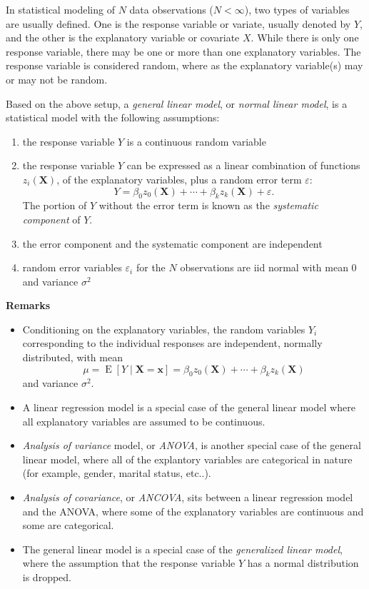 \documentclass[12pt]{article}
\begin{document}

In statistical modeling of $N$ data observations ($N<\infty$), two types of variables are usually defined.  One is the response variable or variate, usually denoted by $Y$, and the other is the explanatory variable or covariate $X$.  While there is only one response variable, there may be one or more than one explanatory variables.  The response variable is considered random, where as the explanatory variable(s) may or may not be random. 
 
Based on the above setup, a \emph{general linear model}, or \emph{normal linear model}, is a statistical model with the following assumptions:
\begin{enumerate}
\item the response variable $Y$ is a continuous random variable
\item the response variable $Y$ can be expressed as a linear combination of functions $z_i(\textbf{X})$, of the explanatory variables, plus a random error term $\varepsilon$:  
$$Y=\beta_0z_0(\textbf{X})+\cdots+\beta_kz_k(\textbf{X})+\varepsilon.$$
The portion of $Y$ without the error term is known as the \emph{systematic component} of $Y$.
\item the error component and the systematic component are independent
\item random error variables $\varepsilon_i$ for the $N$ observations are iid normal with mean 0 and variance $\sigma^2$
\end{enumerate}

\textbf{Remarks}
\begin{itemize}
\item Conditioning on the explanatory variables, the random variables $Y_i$ corresponding to the individual responses are independent, normally distributed, with mean $$\mu=\operatorname{E}[Y\mid\textbf{X}=\boldsymbol{x}]=\beta_0z_0(\textbf{X})+\cdots+\beta_kz_k(\textbf{X})$$ and variance $\sigma^2$.
\item A linear regression model is a special case of the general linear model where all explanatory variables are assumed to be continuous.
\item \emph{Analysis of variance} model, or \emph{ANOVA}, is another special case of the general linear model, where all of the explantory variables are categorical in nature (for example, gender, marital status, etc..).
\item \emph{Analysis of covariance}, or \emph{ANCOVA}, sits between a linear regression model and the ANOVA, where some of the explanatory variables are continuous and some are categorical.
\item The general linear model is a special case of the \emph{generalized linear model}, where the assumption that the response variable $Y$ has a normal distribution is dropped.
\end{itemize}
\end{document}
